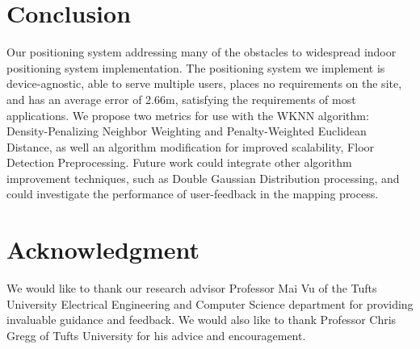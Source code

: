\documentclass[conference]{IEEEtran}
\begin{document}
\section{Conclusion}
Our positioning system addressing many of the obstacles to widespread indoor positioning system implementation. The positioning system we implement is device-agnostic, able to serve multiple users, places no requirements on the site, and has an average error of 2.66m, satisfying the requirements of most applications. We propose two metrics for use with the WKNN algorithm: Density-Penalizing Neighbor Weighting and Penalty-Weighted Euclidean Distance, as well an algorithm modification for improved scalability, Floor Detection Preprocessing. Future work could integrate other algorithm improvement techniques, such as Double Gaussian Distribution processing, and could investigate the performance of user-feedback in the mapping process.


\section*{Acknowledgment}
We would like to thank our research advisor Professor Mai Vu of the Tufts University Electrical Engineering and Computer Science department for providing invaluable guidance and feedback. We would also like to thank Professor Chris Gregg of Tufts University for his advice and encouragement.


\end{document}

